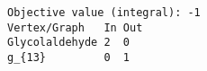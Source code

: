\begin{verbatim}
Objective value (integral): -1
Vertex/Graph   In Out 
Glycolaldehyde 2  0   
g_{13}         0  1   
\end{verbatim}
